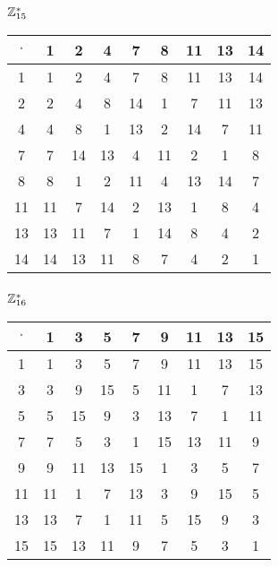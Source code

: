 \subsubsection{$\mathbb{Z}_{15}^*$}
\begin{tabular}{|c|c|c|c|c|c|c|c|c|}
\hline $\cdot$  & 1 & 2 & 4 & 7 & 8 & 11 & 13 & 14\\
\hline 1 & 1 & 2 & 4 & 7 & 8 & 11 & 13 & 14\\
\hline 2 & 2 & 4 & 8 & 14 & 1 & 7 & 11 & 13\\
\hline 4 & 4 & 8 & 1 & 13 & 2 & 14 & 7 & 11\\
\hline 7 & 7 & 14 & 13 & 4 & 11 & 2 & 1 & 8\\
\hline 8 & 8 & 1 & 2 & 11 & 4 & 13 & 14 & 7\\
\hline 11 & 11 & 7 & 14 & 2 & 13 & 1 & 8 & 4\\
\hline 13 & 13 & 11 & 7 & 1 & 14 & 8 & 4 & 2\\
\hline 14 & 14 & 13 & 11 & 8 & 7 & 4 & 2 & 1\\
\hline
\end{tabular}


\subsubsection{$\mathbb{Z}_{16}^*$}
\begin{tabular}{|c|c|c|c|c|c|c|c|c|}
\hline $\cdot$  & 1 & 3 & 5 & 7 & 9 & 11 & 13 & 15\\
\hline 1 & 1 & 3 & 5 & 7 & 9 & 11 & 13 & 15\\
\hline 3 & 3 & 9 & 15 & 5 & 11 & 1 & 7 & 13\\
\hline 5 & 5 & 15 & 9 & 3 & 13 & 7 & 1 & 11\\
\hline 7 & 7 & 5 & 3 & 1 & 15 & 13 & 11 & 9\\
\hline 9 & 9 & 11 & 13 & 15 & 1 & 3 & 5 & 7\\
\hline 11 & 11 & 1 & 7 & 13 & 3 & 9 & 15 & 5\\
\hline 13 & 13 & 7 & 1 & 11 & 5 & 15 & 9 & 3\\
\hline 15 & 15 & 13 & 11 & 9 & 7 & 5 & 3 & 1\\
\hline
\end{tabular}


